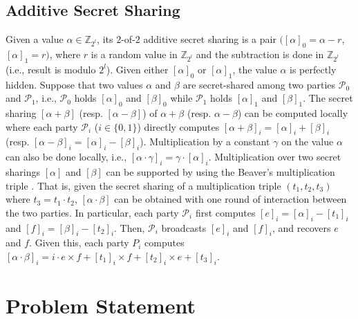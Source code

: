 \documentclass[10pt,journal,compsoc]{IEEEtran}
\begin{document}
\subsection{Additive Secret Sharing} 
%
Given a value $\alpha \in\mathbb{Z}_{2^l}$, its $2$-of-$2$ additive secret sharing is a pair $([\alpha]_0=\alpha-r$, $[\alpha]_1=r)$, where $r$ is a random value in $\mathbb{Z}_{2^l}$ and the subtraction is done in $\mathbb{Z}_{2^l}$ (i.e., result is modulo $2^l$).
%
Given either $[\alpha]_0$ or $[\alpha]_1$, the value $\alpha$ is perfectly hidden.
%
Suppose that two values $\alpha$ and $\beta$ are secret-shared among two parties $\mathcal{P}_0$ and $\mathcal{P}_1$, i.e., $\mathcal{P}_0$ holds $[\alpha]_0$ and $[\beta]_0$ while $\mathcal{P}_1$ holds $[\alpha]_1$ and $[\beta]_1$.
%
%
The secret sharing $[\alpha+\beta]$ (resp. $[\alpha-\beta]$) of $\alpha+\beta$ (resp. $\alpha-\beta$) can be computed locally where each party $\mathcal{P}_i$ ($i\in \{0,1\}$) directly computes $[\alpha+\beta]_{i}=[\alpha]_{i}+[\beta]_{i}$ (resp. $[\alpha-\beta]_{i}=[\alpha]_{i}-[\beta]_{i}$).
%
Multiplication by a constant $\gamma$ on the value $\alpha$ can also be done locally, i.e., $[\alpha\cdot \gamma]_{i}=\gamma \cdot [\alpha]_{i}$. 
%
%
Multiplication over two secret sharings $[\alpha]$ and $[\beta]$ can be supported by using the Beaver's multiplication triple \cite{Beaver91a,Corrigan-GibbsB17}.
%
That is, given the secret sharing of a multiplication triple $(t_1,t_2,t_3)$ where $t_3=t_1\cdot t_2$, $[\alpha\cdot \beta]$ can be obtained with one round of interaction between the two parties.
%
%
In particular, each party $\mathcal{P}_i$ first computes $[e]_i=[\alpha]_i - [t_1]_i$ and $[f]_i=[\beta]_i - [t_2]_i$.
%
%
Then, $\mathcal{P}_i$ broadcasts $[e]_i$ and $[f]_i$, and recovers $e$ and $f$.
%
Given this, each party $P_i$ computes $[\alpha \cdot \beta]_i=i \cdot e \times f+ [t_1]_i \times f + [t_2]_i \times e + [t_3]_i$. 
%







\section{Problem Statement}
\label{sec:problem-statement}
\end{document}
